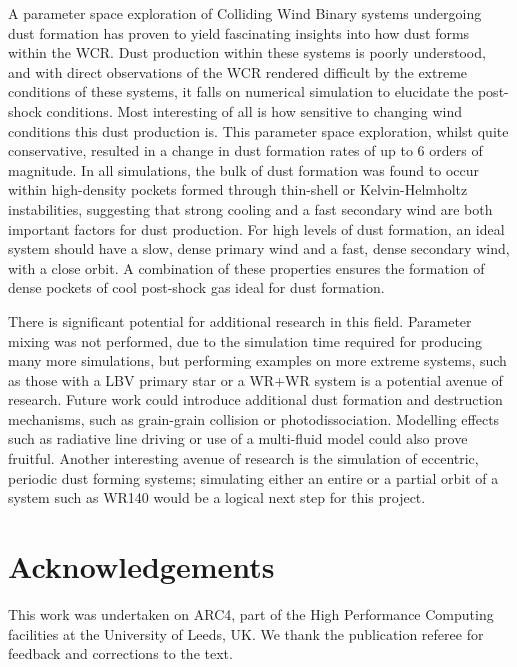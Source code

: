 \documentclass[fleqn,usenatbib]{mnras}
\begin{document}
A parameter space exploration of Colliding Wind Binary systems undergoing dust formation has proven to yield fascinating insights into how dust forms within the WCR.
Dust production within these systems is poorly understood, and with direct observations of the WCR rendered difficult by the extreme conditions of these systems, it falls on numerical simulation to elucidate the post-shock conditions.
Most interesting of all is how sensitive to changing wind conditions this dust production is.
This parameter space exploration, whilst quite conservative, resulted in a change in dust formation rates of up to 6 orders of magnitude.
In all simulations, the bulk of dust formation was found to occur within high-density pockets formed through thin-shell or Kelvin-Helmholtz instabilities, suggesting that strong cooling and a fast secondary wind are both important factors for dust production.
For high levels of dust formation, an ideal system should have a slow, dense primary wind and a fast, dense secondary wind, with a close orbit.
A combination of these properties ensures the formation of dense pockets of cool post-shock gas ideal for dust formation.

There is significant potential for additional research in this field.
Parameter mixing was not performed, due to the simulation time required for producing many more simulations, but performing examples on more extreme systems, such as those with a LBV primary star or a WR+WR system is a potential avenue of research.
Future work could introduce additional dust formation and destruction mechanisms, such as grain-grain collision or photodissociation.
Modelling effects such as radiative line driving or use of a multi-fluid model could also prove fruitful. 
Another interesting avenue of research is the simulation of eccentric, periodic dust forming systems; simulating either an entire or a partial orbit of a system such as WR140 would be a logical next step for this project.

\section{Acknowledgements}

This work was undertaken on ARC4, part of the High Performance Computing facilities at the University of Leeds, UK.
We thank the publication referee for feedback and corrections to the text.

\end{document}
